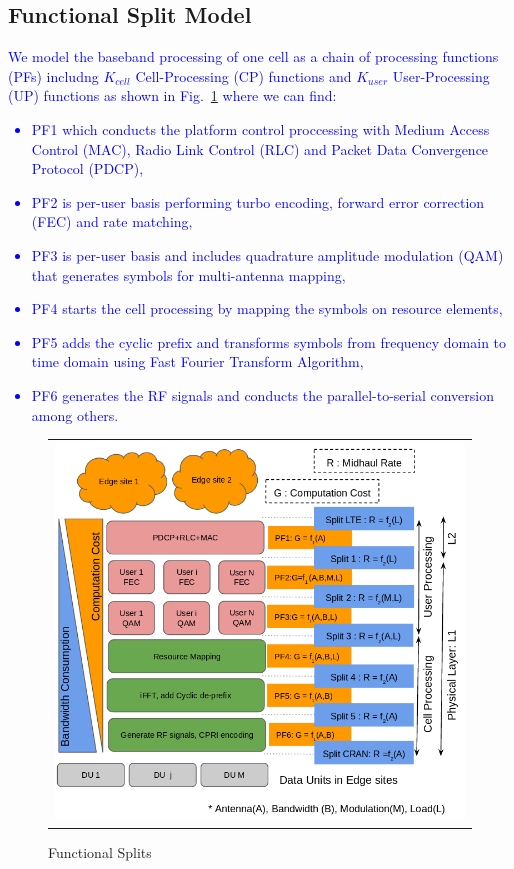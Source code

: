 \documentclass[
    a4paper, 
    12pt, onecolumn,
]{article}
\begin{document}
\subsection{Functional Split Model}
\textcolor{blue}{
We model the baseband processing of one cell as a chain of processing functions (PFs) includng $K_{cell}$ Cell-Processing (CP) functions and $K_{user}$ User-Processing (UP) functions as shown in Fig.~\ref{fig:2} where we can find:
\begin{itemize} 
\item PF1 which conducts the platform control proccessing with Medium Access Control (MAC), Radio Link Control (RLC) and Packet Data Convergence Protocol (PDCP),
\item PF2 is per-user basis performing turbo encoding, forward error correction (FEC) and rate matching,
\item PF3 is per-user basis and includes quadrature amplitude modulation (QAM) that generates symbols for multi-antenna mapping,
\item PF4 starts the cell processing by mapping the symbols on resource elements,
\item PF5 adds the cyclic prefix and transforms symbols from frequency domain to time domain using Fast Fourier Transform Algorithm,
\item PF6 generates the RF signals and conducts the parallel-to-serial conversion among others. 
\end{itemize} 
}
\vspace{0mm}
\begin{figure}[t!]
\begin{center}
\begin{tabular}{c}
\hspace{-0mm}
\includegraphics[scale=0.3]{./images/splits.png}
\end{tabular}
\end{center}
\vspace{-3mm}
\caption{\label{fig:2} Functional Splits}
\end{figure} 
\end{document}
